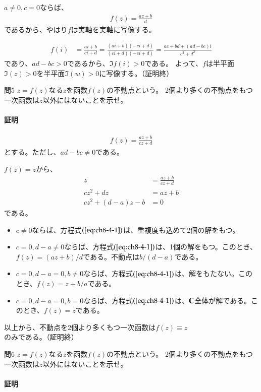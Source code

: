 $a\neq0,c=0$ならば、
\begin{align*}
    f(z)=\frac{az+b}{d}
\end{align*}
であるから、やはり$f$は実軸を実軸に写像する。

\begin{align*}
    f(i)&=\frac{ai+b}{ci+d}
    =\frac{(ai+b)(-ci+d)}{(ci+d)(-ci+d)}
    =\frac{ac+bd+(ad-bc)i}{c^2+d^2}
\end{align*}
であり、$ad-bc>0$であるから、$\Im f(i)>0$である。
よって、$f$は半平面$\Im(z)>0$を半平面$\Im(w)>0$に写像する。（証明終）

\newpage
\begin{mysimplebox}{問5}
    $z=f(z)$なる$z$を函数$f(z)$の不動点という。
    2個より多くの不動点をもつ一次函数は$z$以外にはないことを示せ。
\end{mysimplebox}
\paragraph{証明}
\begin{align*}
    f(z)=\frac{az+b}{cz+d}
\end{align*}
とする。ただし、$ad-bc\neq0$である。

$f(z)=z$から、
\begin{align}
    z&=\frac{az+b}{cz+d}\nonumber\\
    cz^2+dz&=az+b\nonumber\\
    cz^2+(d-a)z-b&=0\label{eq:ch8-4-1}
\end{align}
である。
\begin{itemize}
    \item $c\neq0$ならば、方程式$(\ref{eq:ch8-4-1})$は、重複度も込めて2個の解をもつ。
    \item $c=0,d-a\neq0$ならば、方程式$(\ref{eq:ch8-4-1})$は、1個の解をもつ。このとき、$f(z)=(az+b)/d$である。不動点は$b/(d-a)$である。
    \item $c=0,d-a=0,b\neq0$ならば、方程式$(\ref{eq:ch8-4-1})$は、解をもたない。このとき、$f(z)=z+b/a$である。
    \item $c=0,d-a=0,b=0$ならば、方程式$(\ref{eq:ch8-4-1})$は、$\mathbb{C}$全体が解である。このとき、$f(z)=z$である。
\end{itemize}
以上から、不動点を2個より多くもつ一次函数は$f(z)\equiv z$のみである。（証明終）

\newpage
\begin{mysimplebox}{問6}
    $z=f(z)$なる$z$を函数$f(z)$の不動点という。
    2個より多くの不動点をもつ一次函数は$z$以外にはないことを示せ。
\end{mysimplebox}
\paragraph{証明}
